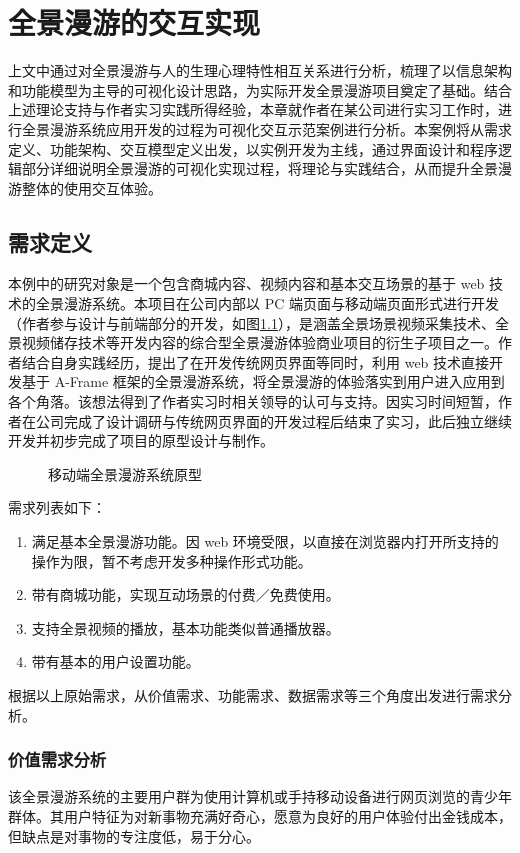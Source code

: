 \chapter{全景漫游的交互实现}
上文中通过对全景漫游与人的生理心理特性相互关系进行分析，梳理了以信息架构和功能模型为主导的可视化设计思路，为实际开发全景漫游项目奠定了基础。结合上述理论支持与作者实习实践所得经验，本章就作者在某公司进行实习工作时，进行全景漫游系统应用开发的过程为可视化交互示范案例进行分析。本案例将从需求定义、功能架构、交互模型定义出发，以实例开发为主线，通过界面设计和程序逻辑部分详细说明全景漫游的可视化实现过程，将理论与实践结合，从而提升全景漫游整体的使用交互体验。

\section{需求定义}
本例中的研究对象是一个包含商城内容、视频内容和基本交互场景的基于 web 技术的全景漫游系统。本项目在公司内部以 PC 端页面与移动端页面形式进行开发（作者参与设计与前端部分的开发，如图\ref{fig:woniu}），是涵盖全景场景视频采集技术、全景视频储存技术等开发内容的综合型全景漫游体验商业项目的衍生子项目之一。作者结合自身实践经历，提出了在开发传统网页界面等同时，利用 web 技术直接开发基于 A-Frame 框架的全景漫游系统，将全景漫游的体验落实到用户进入应用到各个角落。该想法得到了作者实习时相关领导的认可与支持。因实习时间短暂，作者在公司完成了设计调研与传统网页界面的开发过程后结束了实习，此后独立继续开发并初步完成了项目的原型设计与制作。

\begin{figure}[htp]
\centering
{}
\caption{移动端全景漫游系统原型}
\label{fig:woniu}
\end{figure}

需求列表如下：
\begin{enumerate}
	\item 满足基本全景漫游功能。因 web 环境受限，以直接在浏览器内打开所支持的操作为限，暂不考虑开发多种操作形式功能。
	\item 带有商城功能，实现互动场景的付费／免费使用。
	\item 支持全景视频的播放，基本功能类似普通播放器。
	\item 带有基本的用户设置功能。
\end{enumerate}

根据以上原始需求，从价值需求、功能需求、数据需求等三个角度出发进行需求分析。

\subsection{价值需求分析}
该全景漫游系统的主要用户群为使用计算机或手持移动设备进行网页浏览的青少年群体。其用户特征为对新事物充满好奇心，愿意为良好的用户体验付出金钱成本，但缺点是对事物的专注度低，易于分心。

